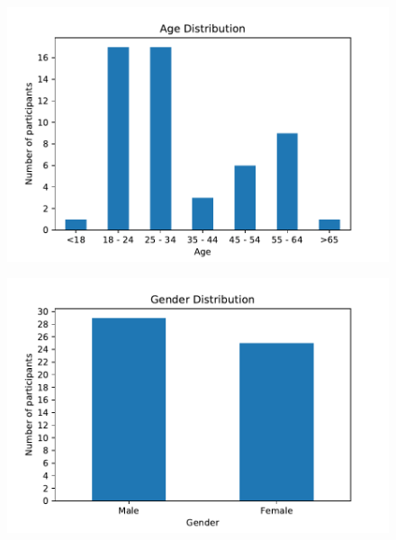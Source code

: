 \begin{figure}
\centering
\begin{minipage}{.5\textwidth}
  \centering
  \includegraphics[width=\linewidth]{img/subjective_measures/demographic/age_plot.pdf}
  \label{fig:age}
\end{minipage}%
\begin{minipage}{.5\textwidth}
  \centering
  \includegraphics[width=\linewidth]{img/subjective_measures/demographic/gender_plot.pdf}
  \label{fig:gender}
\end{minipage}
\end{figure}


